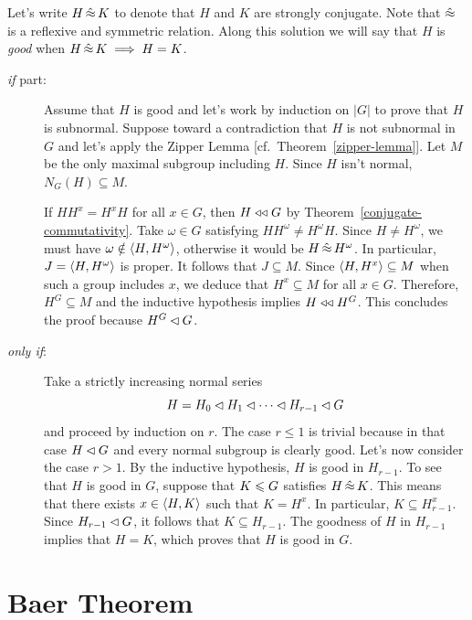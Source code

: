 \newcommand{\sconj}{\op{\hat\approx}}
\begin{solution} Let's write $H\sconj K$ to denote that $H$ and $K$ are strongly conjugate. Note that $\sconj$ is a reflexive and symmetric relation. Along this solution we will say that $H$ is \textsl{good} when $H\sconj K\implies H=K$.

\begin{description}
    \item[\normalfont\textit{if\/} part:] Assume that $H$ is good and let's work by induction on $|G|$ to prove that $H$ is subnormal. Suppose toward a contradiction that $H$ is not subnormal in $G$ and let's apply the Zipper Lemma [cf.~Theorem~\ref{zipper-lemma}]. Let $M$ be the only maximal subgroup including $H$. Since $H$ isn't normal, $N_G(H)\subseteq M$.
    
    If $HH^x=H^xH$ for all $x\in G$, then $H\mathrel{\triangleleft\triangleleft} G$ by Theorem~\ref{conjugate-commutativity}. Take $\omega\in G$ satisfying $HH^\omega\ne H^\omega H$. Since $H\ne H^\omega$, we must have $\omega\notin\langle H,H^\omega\rangle$, otherwise it would be $H\sconj H^\omega$. In particular, $J=\langle H,H^\omega\rangle$ is proper. It follows that $J\subseteq M$. Since $\langle H,H^x\rangle\subseteq M$ when such a group includes $x$, we deduce that $H^x\subseteq M$ for all $x\in G$. Therefore, $H^G\subseteq M$ and the inductive hypothesis implies $H\mathrel{\triangleleft\triangleleft} H^G$. This concludes the proof because $H^G\lhd G$.
    
    
    \item[\normalfont\textit{only if\/}:] Take a strictly increasing normal series
    $$
        H = H_0\lhd H_1\lhd\cdots\lhd H_{r-1}\lhd G
    $$
    and proceed by induction on $r$. The case $r\le1$ is trivial because in that case $H\lhd G$ and every normal subgroup is clearly good. Let's now consider the case $r>1$. By the inductive hypothesis, $H$ is good in $H_{r-1}$. To see that $H$ is good in $G$, suppose that $K\leqslant G$ satisfies $H\sconj K$. This means that there exists $x\in\langle H,K\rangle$ such that $K=H^x$. In particular, $K\subseteq H_{r-1}^x$. Since $H_{r-1}\lhd G$, it follows that $K\subseteq H_{r-1}$. The goodness of $H$ in $H_{r-1}$ implies that $H=K$, which proves that $H$ is good in $G$.
\end{description}
\end{solution}

\section{Baer Theorem}

